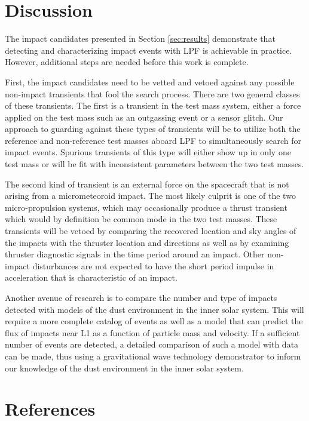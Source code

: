 \documentclass[a4paper]{jpconf}
\begin{document}
\section{Discussion}
\label{sec:discuss}
The impact candidates presented in Section \ref{sec:results} demonstrate that detecting and characterizing impact events with LPF is achievable in practice. However, additional steps are needed before this work is complete. 
\par
First, the impact candidates need to be vetted and vetoed against any possible non-impact transients that fool the search process.  There are two general classes of these transients. The first is a transient in the test mass system, either a force applied on the test mass such as an outgassing event or a sensor glitch. Our approach to guarding against these types of transients will be to utilize both the reference and non-reference test masses aboard LPF to simultaneously search for impact events. Spurious transients of this type will either show up in only one test mass or will be fit with inconsistent parameters between the two test masses.
\par
The second kind of transient is an external force on the spacecraft that is not arising from a micrometeoroid impact. The most likely culprit is one of the two micro-propulsion systems, which may occasionally produce a thrust transient which would by definition be common mode in the two test masses. These transients will be vetoed by comparing the recovered location and sky angles of the impacts with the thruster location and directions as well as by examining  thruster diagnostic signals in the time period around an impact. Other non-impact disturbances are not expected to have the short period impulse in acceleration that is characteristic of an impact. 
\par
Another avenue of research is to compare the number and type of impacts detected with models of the dust environment in the inner solar system. This will require a more complete catalog of events as well as a model that can predict the flux of impacts near L1 as a function of particle mass and velocity. If a sufficient number of events are detected, a detailed comparison of such a model with data can be made, thus using a gravitational wave technology demonstrator to inform our knowledge of the dust environment in the inner solar system.
\section*{References}


\end{document}
